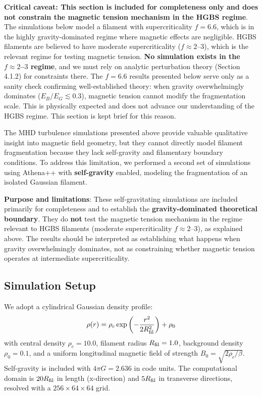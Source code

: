 \documentclass[11pt,a4paper]{article}
\begin{document}
\textbf{Critical caveat: This section is included for completeness only and does \textbf{not} constrain the magnetic tension mechanism in the HGBS regime}. The simulations below model a filament with supercriticality $f = 6.6$, which is in the highly gravity-dominated regime where magnetic effects are negligible. HGBS filaments are believed to have moderate supercriticality ($f \approx 2$--$3$), which is the relevant regime for testing magnetic tension. \textbf{No simulation exists in the $f \approx 2$--$3$ regime}, and we must rely on analytic perturbation theory (Section 4.1.2) for constraints there. The $f = 6.6$ results presented below serve only as a sanity check confirming well-established theory: when gravity overwhelmingly dominates ($E_B/E_G \lesssim 0.3$), magnetic tension cannot modify the fragmentation scale. This is physically expected and does not advance our understanding of the HGBS regime. This section is kept brief for this reason.

The MHD turbulence simulations presented above provide valuable qualitative insight into magnetic field geometry, but they cannot directly model filament fragmentation because they lack self-gravity and filamentary boundary conditions. To address this limitation, we performed a second set of simulations using Athena++ with \textbf{self-gravity} enabled, modeling the fragmentation of an isolated Gaussian filament.

\textbf{Purpose and limitations}: These self-gravitating simulations are included primarily for completeness and to establish the \textbf{gravity-dominated theoretical boundary}. They do \textbf{not} test the magnetic tension mechanism in the regime relevant to HGBS filaments (moderate supercriticality $f \approx 2$--$3$), as explained above. The results should be interpreted as establishing what happens when gravity overwhelmingly dominates, not as constraining whether magnetic tension operates at intermediate supercriticality.

\subsection{Simulation Setup}

We adopt a cylindrical Gaussian density profile:
\begin{equation}
\rho(r) = \rho_c \exp\left(-\frac{r^2}{2 R_{\rm fil}^2}\right) + \rho_0
\end{equation}
with central density $\rho_c = 10.0$, filament radius $R_{\rm fil} = 1.0$, background density $\rho_0 = 0.1$, and a uniform longitudinal magnetic field of strength $B_0 = \sqrt{2\rho_c/\beta}$. Self-gravity is included with $4\pi G = 2.636$ in code units. The computational domain is $20 R_{\rm fil}$ in length (x-direction) and $5 R_{\rm fil}$ in transverse directions, resolved with a $256 \times 64 \times 64$ grid.
\end{document}

